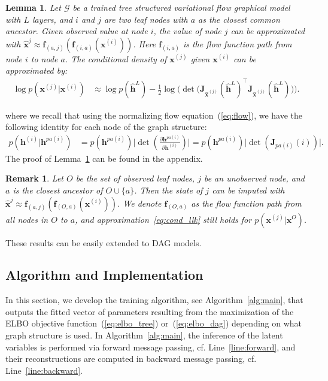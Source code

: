 \documentclass{article} %
\newtheorem{lemma}{Lemma}
\newtheorem{remark}{Remark}
\begin{document}
\begin{lemma}\label{lm:apprx}
Let $\mathcal{G}$ be a trained tree structured variational flow graphical model with $L$ layers, and $i$ and $j$ are two leaf nodes with $a$ as the closest common ancestor. Given observed value at node $i$, the value of node $j$ can be approximated with   $\widehat{\mathbf{x}}^{j} \approx  \mathbf{f}_{(a,j)}(\mathbf{f}_{(i, a)}(\mathbf{x}^{(i)}))$. Here $\mathbf{f}_{(i, a)}$ is the flow function path from node $i$ to node $a$. The conditional density of $\mathbf{x}^{(j)}$ given $\mathbf{x}^{(i)}$ can be approximated by: 
\begin{align} \label{eq:cond_llk}
\log p(\mathbf{x}^{(j)} | \mathbf{x}^{(i)}) &\approx  \log p(\widehat{\mathbf{h}}^L) -  \frac{1}{2} \log \big(\det \big(\mathbf{J}_{\widehat{\mathbf{x}}^{(j)}}(\widehat{\mathbf{h}}^L)^\top\mathbf{J}_{\widehat{\mathbf{x}}^{(j)}}(\widehat{\mathbf{h}}^L)\big) \big).
\end{align}
\end{lemma}
where we recall that using the normalizing flow equation~(\ref{eq:flow}), we have the following identity for each node of the graph structure:
\begin{align*}
p(\mathbf{h}^{(i)} | \mathbf{h}^{pa(i)}) & = p(\mathbf{h}^{pa(i)}) \big|\det(\frac{\partial \mathbf{h}^{pa(i)} }{\partial \mathbf{h}^{(i)}})\big| =
p(\mathbf{h}^{pa(i)}) \big|\det(\mathbf{J}_{pa(i)}(i))\big| .
\end{align*} 
The proof of Lemma~\ref{lm:apprx} can be found in the appendix. 

\begin{remark}\label{rmk:apprx_mul}
Let $O$ be the set of observed leaf nodes, $j$ be an unobserved node, and $a$ is the closest ancestor of $O \cup \{a\}$. Then the state of $j$ can be imputed with  $\widehat{\mathbf{x}}^{j} \approx  \mathbf{f}_{(a,j)}(\mathbf{f}_{(O, a)}(\mathbf{x}^{(i)}))$.  
We denote $\mathbf{f}_{(O, a)}$ as the flow function path from all nodes in $O$ to $a$, and approximation~\eqref{eq:cond_llk} still holds for $p(\mathbf{x}^{(j)} | \mathbf{x}^{O})$.
\end{remark}
These results can be easily extended to DAG models. 

\subsection{Algorithm and Implementation}
In this section, we develop the training algorithm, see Algorithm~\ref{alg:main}, that outputs the fitted vector of parameters resulting from the maximization of the ELBO objective function~(\eqref{eq:elbo_tree}) or~(\eqref{eq:elbo_dag}) depending on what graph structure is used.
In Algorithm~\ref{alg:main}, the inference of the latent variables is performed via forward message passing, cf. Line~\ref{line:forward}, and their reconstructions are computed in backward message passing, cf. Line~\ref{line:backward}.
\end{document}
